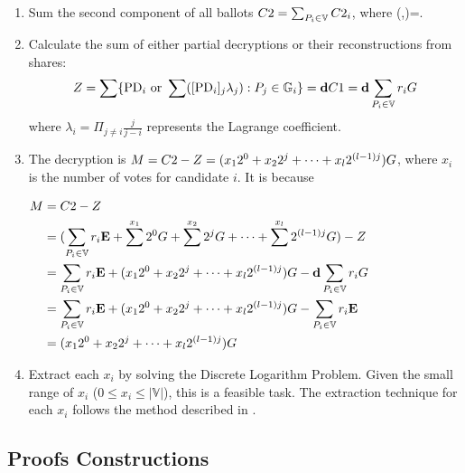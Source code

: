 \documentclass[runningheads]{llncs}
\begin{document}
\begin{enumerate}
    \item Sum the second component of all ballots $C2 = \sum_{P_{i} \in \mathbb{V}} C2_{i}$, where (,)=.
    
    \item Calculate the sum of either partial decryptions or their reconstructions from shares: \[Z = \sum\{\mathrm{PD}_{i} \textrm{ or } \sum ([\mathrm{PD}_{i}]_{j} \lambda_{j}) : P_{j} \in \mathbb{G}_{i}\} = \textbf{d}{} C1 = \mathbf{d} \sum_{P_{i} \in \mathbb{V}} r_i G \] where $\lambda_{i}=\Pi_{j \neq i}\frac{j}{j-i}$ represents the Lagrange coefficient.

    \item The decryption is $M=C2{} - Z=(x_1 2^0 + x_2 2^j + \dots + x_l 2^{(l-1)j}) G$, where $x_i$ is the number of votes for candidate $i$. It is because 
    
    $\begin{aligned} M&=C2-Z \\
        &= (\sum_{P_{i} \in \mathbb{V}} r_{i} \mathbf{E} + \sum^{x_1} 2^0 G + \sum^{x_2} 2^j G + \dots + \sum^{x_l} 2^{(l-1)j} G ) - Z \\
        &= \sum_{P_{i} \in \mathbb{V}} r_{i} \mathbf{E} + (x_1 2^0 + x_2 2^j + \dots + x_l 2^{(l-1)j}) G - \mathbf{d} \sum_{P_{i} \in \mathbb{V}} r_i G \\
        &= \sum_{P_{i} \in \mathbb{V}} r_{i} \mathbf{E} + (x_1 2^0 + x_2 2^j + \dots + x_l 2^{(l-1)j})G - \sum_{P_{i} \in \mathbb{V}} r_{i} \mathbf{E}\\
        &= (x_1 2^0 + x_2 2^j + \dots + x_l 2^{(l-1)j}) G\\
        \end{aligned}$
    
    \item Extract each $x_i$ by solving the Discrete Logarithm Problem. Given the small range of $x_i$ ($0 \leq x_i \leq |\mathbb{V}|$), this is a feasible task. The extraction technique for each $x_i$ follows the method described in \cite{haoAnonymousVotingTworound2010}.
\end{enumerate}





\subsection{Proofs Constructions}\label{sec:proofs}
\end{document}
